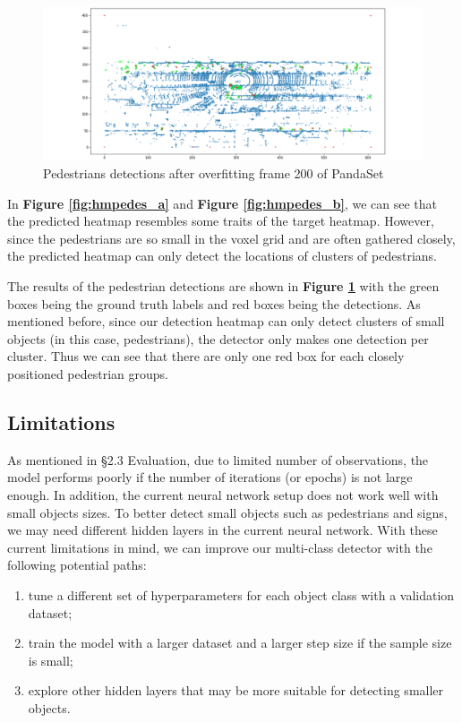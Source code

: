 \documentclass[letter]{article}
\newcommand{\fref}[1]{\textbf{Figure \ref{#1}}}
\begin{document}
	\begin{figure}[h]
		\centering
		\includegraphics[width=\linewidth]{images/det_overfit_pedes.png}
		\caption{Pedestrians detections after overfitting frame 200 of PandaSet}
		\label{fig:detpedes}
	\end{figure}

	In \fref{fig:hmpedes_a} and \fref{fig:hmpedes_b}, we can see that the predicted heatmap resembles some traits of the target heatmap. However, since the pedestrians are so small in the voxel grid and are often gathered closely, the predicted heatmap can only detect the locations of clusters of pedestrians. 

	The results of the pedestrian detections are shown in \fref{fig:detpedes} with the green boxes being the ground truth labels and red boxes being the detections. As mentioned before, since our detection heatmap can only detect clusters of small objects (in this case, pedestrians), the detector only makes one detection per cluster. Thus we can see that there are only one red box for each closely positioned pedestrian groups. 

	\subsection{Limitations}

	As mentioned in \S 2.3 Evaluation, due to limited number of observations, the model performs poorly if the number of iterations (or epochs) is not large enough. In addition, the current neural network setup does not work well with small objects sizes. To better detect small objects such as pedestrians and signs, we may need different hidden layers in the current neural network. With these current limitations in mind, we can improve our multi-class detector with the following potential paths: \begin{enumerate}
		\item tune a different set of hyperparameters for each object class with a validation dataset;
		\item train the model with a larger dataset and a larger step size if the sample size is small;
		\item explore other hidden layers that may be more suitable for detecting smaller objects. 
	\end{enumerate}
	
\end{document}
